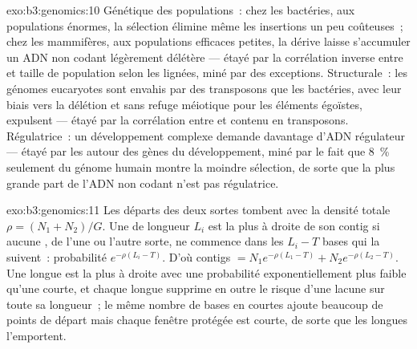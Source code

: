 \begin{solution}{exo:b3:genomics:10}
Génétique des populations~: chez les bactéries, aux populations
énormes, la sélection élimine même les insertions un peu coûteuses~;
chez les mammifères, aux populations efficaces petites, la dérive laisse
s'accumuler un ADN non codant légèrement délétère --- étayé par la
corrélation inverse entre  et taille de population selon
les lignées, miné par des exceptions. Structurale~: les génomes
eucaryotes sont envahis par des transposons que les bactéries, avec leur
biais vers la délétion et sans refuge méiotique pour les éléments
égoïstes, expulsent --- étayé par la corrélation entre 
et contenu en transposons. Régulatrice~: un développement complexe
demande davantage d'ADN régulateur --- étayé par les  autour des gènes du développement, miné par le fait
que \qty{8}{\%} seulement du génome humain montre la moindre sélection,
de sorte que la plus grande part de l'ADN non codant n'est pas
régulatrice.
\end{solution}

\begin{solution}{exo:b3:genomics:11}
Les départs des deux sortes tombent avec la densité totale $\rho = (N_{1} +
N_{2})/G$. Une  de longueur $L_{i}$ est la plus à droite de son
contig si aucune , de l'une ou l'autre sorte, ne commence dans
les $L_{i} - T$ bases qui la suivent~: probabilité
$e^{-\rho(L_{i} - T)}$. D'où contigs $= N_{1}
e^{-\rho(L_{1} - T)} + N_{2} e^{-\rho(L_{2} - T)}$. Une longue 
est la plus à droite avec une probabilité exponentiellement plus faible
qu'une courte, et chaque longue  supprime en outre le risque
d'une lacune sur toute sa longueur~; le même nombre de bases en 
courtes ajoute beaucoup de points de départ mais chaque fenêtre protégée
est courte, de sorte que les longues  l'emportent.
\end{solution}

